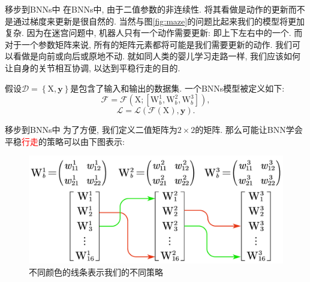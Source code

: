 \documentclass{beamer}
\begin{document}
\begin{frame}{移步到BNNs中}
    \footnotesize
    在BNNs中, 由于二值参数的非连续性. 将其看做是动作的更新而不是通过梯度来更新是很自然的. 当然与图\ref{fig:maze}的问题比起来我们的模型将更加复杂. 因为在迷宫问题中, 机器人只有一个动作需要更新: 即上下左右中的一个. 而对于一个参数矩阵来说, 所有的矩阵元素都将可能是我们需要更新的动作. 我们可以看做是向前或向后或原地不动. 就如同人类的婴儿学习走路一样, 我们应该如何让自身的关节相互协调, 以达到平稳行走的目的.
    \par 假设$\mathcal{D} =\left\{ \mathrm{X},\boldsymbol{y} \right\} $是包含了输入和输出的数据集. 一个BNNs模型被定义如下:
    \begin{equation}
        \mathcal{F} =\mathcal{F} \left( \mathrm{X};\left[ \mathrm{W}_{b}^{1},\mathrm{W}_{b}^{2},\mathrm{W}_{b}^{3} \right] \right),
    \end{equation}
    \begin{equation}
        \mathcal{L} =\mathcal{L} \left( \mathcal{F} \left( \mathrm{X} \right) ,\boldsymbol{y} \right).
    \end{equation}
\end{frame}


\begin{frame}{移步到BNNs中}
    \footnotesize
    为了方便, 我们定义二值矩阵为$2\times 2$的矩阵. 那么可能让BNN学会平稳\textcolor{red}{行走}的策略可以由下图表示:
    \begin{figure}
        \centering
        \includegraphics[scale=0.4]{pic/w3.pdf}
        \caption{不同颜色的线条表示我们的不同策略}
    \end{figure}
\end{frame}
\end{document}
